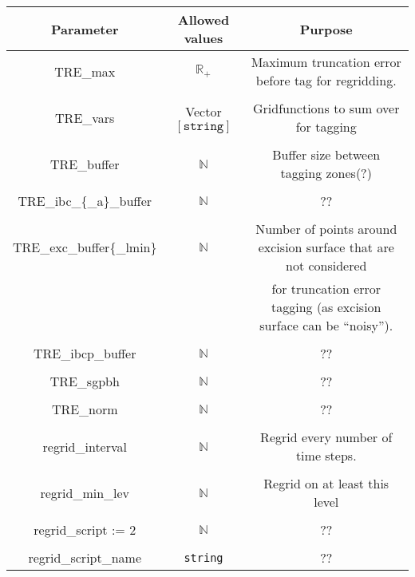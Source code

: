 \documentclass{article}
\begin{document}
\begin{table}[h]
   \centering 
   \begin{tabular}{ccc}
      Parameter  & Allowed values & Purpose \\
      \midrule\midrule
      TRE\_max &
      $\mathbb{R}_+$
      &
      Maximum truncation error before tag for regridding.
      \\ \\
      TRE\_vars 
      &
      Vector $\left[ \mathtt{string} \right]$
      &
      Gridfunctions to sum over for tagging
      \\ \\
      TRE\_buffer
      &
      $\mathbb{N}$
      &
      Buffer size between tagging zones(?)
      \\ \\
      TRE\_ibc\_\{\_a\}\_buffer 
      &
      $\mathbb{N}$
      &
      ??
      \\ \\
      TRE\_exc\_buffer\{\_lmin\}
      &
      $\mathbb{N}$
      &
      Number of points around excision surface that are not considered
      \\
      & & 
      for truncation error tagging (as excision surface can be ``noisy'').
      \\ \\
      TRE\_ibcp\_buffer
      &
      $\mathbb{N}$
      &
      ??
      \\ \\
      TRE\_sgpbh
      &
      $\mathbb{N}$
      &
      ??
      \\ \\
      TRE\_norm
      &
      $\mathbb{N}$
      &
      ??
      \\ \\
      regrid\_interval 
      &
      $\mathbb{N}$
      &
      Regrid every number of time steps. 
      \\ \\
      regrid\_min\_lev &
      $\mathbb{N}$
      &
      Regrid on at least this level
      \\ \\
      regrid\_script := 2
      &
      $\mathbb{N}$
      &
      ??
      \\ \\
      regrid\_script\_name 
      &
      \texttt{string}
      &
      ??
   \end{tabular}
\end{table}
\end{document}
